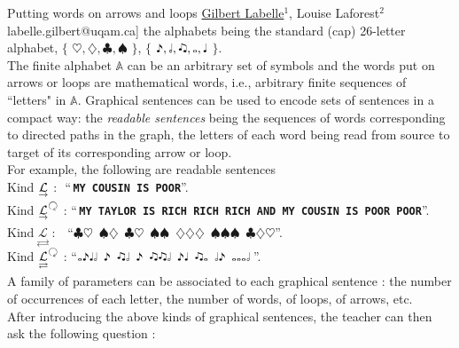 \begin{abstract_online}{Putting words on arrows and loops}{%
        \underline{Gilbert Labelle}$^{1}$, Louise Laforest$^{2}$}{labelle.gilbert@uqam.ca]
        }
\noindent the alphabets being the standard (cap) 26-letter alphabet,  $\{$ {\boldmath ${\heartsuit, \diamondsuit,  \clubsuit, \spadesuit}$} $\}$, $\{$ {\boldmath ${\eighthnote,\halfnote,\twonotes,\fullnote,\quarternote}$} $\}$.\\

\noindent The finite alphabet $\mathbb{A}$ can be an arbitrary set of symbols and the words put on arrows or loops are mathematical words, i.e., arbitrary finite sequences of ``letters" in $\mathbb{A}$. Graphical sentences can be used to encode sets of sentences in a compact way: the \emph{readable sentences} being the sequences of words corresponding to directed paths in the graph, the letters of each word being read from source to target of its corresponding arrow or loop.\\

\noindent For example, the following are readable sentences\\

\noindent Kind $\underset{\raisebox{0.4ex}{$\scriptstyle \rightarrow $}}{\mathcal{L}}$ : \,\,``\,{\texttt{\textbf{MY COUSIN IS POOR}}}''.\\
Kind $\underset{\raisebox{0.4ex}{$\scriptstyle \rightarrow $}}{\mathcal{L}}^{\rotatebox[origin=c]{-180}{$\circlearrowright$}}$ : ``\,{\texttt{\textbf{MY TAYLOR IS RICH RICH RICH AND MY COUSIN IS POOR POOR}}}''.\\
Kind $\underset{\rightleftarrows}{\mathcal{L}}$ : \,\,\,\,``$\clubsuit  \heartsuit \, \,\,   \spadesuit \diamondsuit \,\,\, \clubsuit  \heartsuit \,\,\, \spadesuit \spadesuit \,\,\, \diamondsuit \diamondsuit \diamondsuit \,\,\, \spadesuit \spadesuit  \spadesuit \,\,\,\clubsuit \diamondsuit \heartsuit $''.\\
Kind $\underset{\rightleftarrows}{\mathcal{L}}^{\rotatebox[origin=c]{-180}{$\circlearrowright$}}$ :  ``$\fullnote \eighthnote \quarternote \halfnote \,\,\, \eighthnote \,\,\, \twonotes  \halfnote \,\,\, \eighthnote \,\,\, \twonotes \twonotes \halfnote \,\,\, \eighthnote \quarternote \,\,\,  \twonotes \fullnote \,\,\, \halfnote \eighthnote \,\,\,  \fullnote \fullnote \fullnote \halfnote$\,''.\\

\noindent A family of parameters can be associated to each graphical sentence : the number of occurrences of each letter, the number of words, of loops, of arrows, etc. 
\\

 After introducing the above kinds of graphical sentences, the teacher can then ask the following question :\\


\end{abstract_online}
